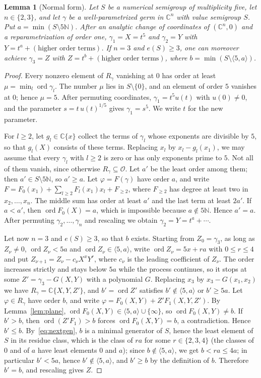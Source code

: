 \documentclass{amsart}
\newtheorem{lemma}[theorem]{Lemma}
\theoremstyle{definition}
\theoremstyle{remark}
\numberwithin{equation}{section}
\newcommand{\N}{\mathbb{N}}
\newcommand{\C}{\mathbb{C}}
\newcommand{\cO}{\mathcal{O}}
\newcommand{\ord}{\operatorname{ord}}
\newcommand{\gen}[1]{\langle #1\rangle}
\begin{document}
\begin{lemma}[Normal form]\label{lem:normal}
Let $S$ be a numerical semigroup of multiplicity five, let $n\in\{2,3\}$, and let $\gamma$ be a well-parametrized germ in $\C^n$ with value semigroup $S$. Put $a=\min(S\setminus5\N)$. After an analytic change of coordinates of $(\C^n,0)$ and a reparametrization of order one, $\gamma_1=X=t^5$ and $\gamma_2=Y$ with $Y=t^a+(\text{higher order terms})$. If $n=3$ and $e(S)\ge3$, one can moreover achieve $\gamma_3=Z$ with $Z=t^b+(\text{higher order terms})$, where $b=\min(S\setminus\gen{5,a})$.
\end{lemma}

\begin{proof}
Every nonzero element of $R_\gamma$ vanishing at $0$ has order at least $\mu=\min_l\ord\gamma_l$. The number $\mu$ lies in $S\setminus\{0\}$, and an element of order $5$ vanishes at $0$; hence $\mu=5$. After permuting coordinates, $\gamma_1=t^5u(t)$ with $u(0)\ne0$, and the parameter $s=t\,u(t)^{1/5}$ gives $\gamma_1=s^5$. We write $t$ for the new parameter.

For $l\ge2$, let $g_l\in\C\{x\}$ collect the terms of $\gamma_l$ whose exponents are divisible by $5$, so that $g_l(X)$ consists of these terms. Replacing $x_l$ by $x_l-g_l(x_1)$, we may assume that every $\gamma_l$ with $l\ge2$ is zero or has only exponents prime to $5$. Not all of them vanish, since otherwise $R_\gamma\subseteq\cO$. Let $a'$ be the least order among them; then $a'\in S\setminus5\N$, so $a'\ge a$. Let $\varphi=F(\gamma)$ have order $a$, and write $F=F_0(x_1)+\sum_{l\ge2}F_l(x_1)x_l+F_{\ge2}$, where $F_{\ge2}$ has degree at least two in $x_2,\dots,x_n$. The middle sum has order at least $a'$ and the last term at least $2a'$. If $a<a'$, then $\ord F_0(X)=a$, which is impossible because $a\notin5\N$. Hence $a'=a$. After permuting $\gamma_2,\dots,\gamma_n$ and rescaling we obtain $\gamma_2=Y=t^a+\cdots$.

Let now $n=3$ and $e(S)\ge3$, so that $b$ exists. Starting from $Z_0=\gamma_3$, as long as $Z_\nu\ne0$, $\ord Z_\nu<5a$ and $\ord Z_\nu\in\gen{5,a}$, write $\ord Z_\nu=5x+ra$ with $0\le r\le4$ and put $Z_{\nu+1}=Z_\nu-c_\nu X^xY^r$, where $c_\nu$ is the leading coefficient of $Z_\nu$. The order increases strictly and stays below $5a$ while the process continues, so it stops at some $Z'=\gamma_3-G(X,Y)$ with a polynomial $G$. Replacing $x_3$ by $x_3-G(x_1,x_2)$ we have $R_\gamma=\C\{X,Y,Z'\}$, and $b'=\ord Z'$ satisfies $b'\notin\gen{5,a}$ or $b'\ge5a$. Let $\varphi\in R_\gamma$ have order $b$, and write $\varphi=F_0(X,Y)+Z'F_1(X,Y,Z')$. By Lemma~\ref{lem:plane}, $\ord F_0(X,Y)\in\gen{5,a}\cup\{\infty\}$, so $\ord F_0(X,Y)\ne b$. If $b'>b$, then $\ord(Z'F_1)>b$ forces $\ord F_0(X,Y)=b$, a contradiction. Hence $b'\le b$. By~\eqref{eq:nextgen}, $b$ is a minimal generator of $S$, hence the least element of $S$ in its residue class, which is the class of $ra$ for some $r\in\{2,3,4\}$ (the classes of $0$ and of $a$ have least elements $0$ and $a$); since $b\notin\gen{5,a}$, we get $b<ra\le4a$; in particular $b'<5a$, hence $b'\notin\gen{5,a}$, and $b'\ge b$ by the definition of $b$. Therefore $b'=b$, and rescaling gives $Z$.
\end{proof}
\end{document}
